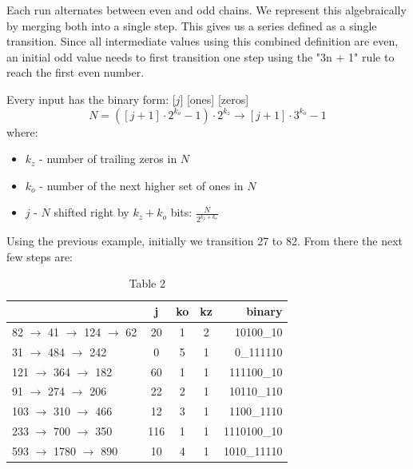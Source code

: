 \documentclass[preprint]{sigplanconf}
\begin{document}
Each run alternates between even and odd chains. We represent this algebraically by merging both into a single step. This gives us a series defined as a single transition. Since all intermediate values using this combined definition are even, an initial odd value needs to first transition one step using the "3n + 1" rule to reach the first even number.

Every input has the binary form: [$j$] [ones] [zeros]
\[
    N = ([j + 1] \cdot 2^{k_o} - 1) \cdot 2^{k_z} \rightarrow [j + 1] \cdot 3^{k_o} - 1
\]
where:
\begin{itemize}
    \item $k_z$ - number of trailing zeros in $N$
    \item $k_o$ - number of the next higher set of ones in $N$
    \item $j$ - $N$ shifted right by $k_z + k_o$ bits: $\frac{N}{2^{k_z + k_o}}$
\end{itemize}

Using the previous example, initially we transition 27 to 82. From there the next few steps are:

\begin{table}
    \begin{center}
        \begin{tabular}{|l|c|c|c|r|}
            \hline
                                             & \textbf{j} & \textbf{ko} & \textbf{kz} & \textbf{binary} \\
            \hline
            82 $\to$ 41  $\to$  124 $\to$ 62 & 20         & 1           & 2           & 10100\_10       \\
            \hline
            31  $\to$  484 $\to$ 242         & 0          & 5           & 1           & 0\_111110       \\
            \hline
            121 $\to$  364 $\to$ 182         & 60         & 1           & 1           & 111100\_10      \\
            \hline
            91 $\to$  274 $\to$ 206          & 22         & 2           & 1           & 10110\_110      \\
            \hline
            103 $\to$  310 $\to$ 466         & 12         & 3           & 1           & 1100\_1110      \\
            \hline
            233 $\to$  700 $\to$ 350         & 116        & 1           & 1           & 1110100\_10     \\
            \hline
            593 $\to$ 1780 $\to$ 890         & 10         & 4           & 1           & 1010\_11110     \\
            \hline
        \end{tabular}
        \caption{Table 2}
        \label{tab-2}
    \end{center}
\end{table}
\end{document}

